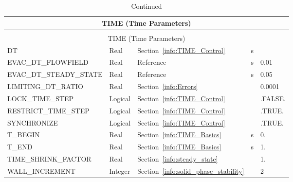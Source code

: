 \documentclass[11pt]{book}
\begin{document}
\begin{longtable}{@{\extracolsep{\fill}}|l|l|l|l|l|}
\caption[Time parameters ({\ct TIME} namelist group)]{For more information see Section~\ref{info:TIME}.}
\label{tbl:TIME} \\
\hline
\multicolumn{5}{|c|}{{\ct TIME} (Time Parameters)} \\
\hline \hline
\endfirsthead
\caption[]{Continued} \\
\hline
\multicolumn{5}{|c|}{{\ct TIME} (Time Parameters)} \\
\hline \hline
\endhead
{\ct DT}                        & Real       & Section~\ref{info:TIME_Control}           & s           &                 \\ \hline
{\ct EVAC\_DT\_FLOWFIELD}       & Real       & Reference~\cite{FDS_Evac_Users_Guide}     & s           &  0.01           \\ \hline
{\ct EVAC\_DT\_STEADY\_STATE}   & Real       & Reference~\cite{FDS_Evac_Users_Guide}     & s           &  0.05           \\ \hline
{\ct LIMITING\_DT\_RATIO}       & Real       & Section~\ref{info:Errors}                 &               &  0.0001         \\ \hline
{\ct LOCK\_TIME\_STEP}          & Logical    & Section~\ref{info:TIME_Control}           &             & {\ct .FALSE.}   \\ \hline
{\ct RESTRICT\_TIME\_STEP}      & Logical    & Section~\ref{info:TIME_Control}           &             & {\ct .TRUE.}    \\ \hline
{\ct SYNCHRONIZE}               & Logical    & Section~\ref{info:TIME_Control}           &             & {\ct .TRUE.}    \\ \hline
{\ct T\_BEGIN}                  & Real       & Section~\ref{info:TIME_Basics}            & s           & 0.              \\ \hline
{\ct T\_END}                    & Real       & Section~\ref{info:TIME_Basics}            & s           & 1.              \\ \hline
{\ct TIME\_SHRINK\_FACTOR}      & Real       & Section~\ref{info:steady_state}           &             & 1.              \\ \hline
{\ct WALL\_INCREMENT}           & Integer    & Section~\ref{info:solid_phase_stability}  &             & 2               \\ \hline
\end{longtable}

\vspace{\baselineskip}
\end{document}
